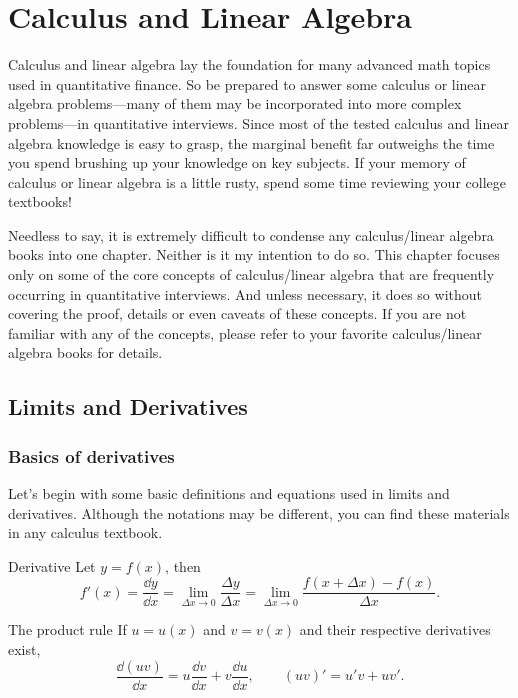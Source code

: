 \section{Calculus and Linear Algebra}

Calculus and linear algebra lay the foundation for many advanced math topics used in
quantitative finance. So be prepared to answer some calculus or linear algebra
problems---many of them may be incorporated into more complex problems---in
quantitative interviews. Since most of the tested calculus and linear algebra knowledge
is easy to grasp, the marginal benefit far outweighs the time you spend brushing up your
knowledge on key subjects. If your memory of calculus or linear algebra is a little rusty,
spend some time reviewing your college textbooks!

Needless to say, it is extremely difficult to condense any calculus/linear algebra books
into one chapter. Neither is it my intention to do so. This chapter focuses only on some
of the core concepts of calculus/linear algebra that are frequently occurring in
quantitative interviews. And unless necessary, it does so without covering the proof,
details or even caveats of these concepts. If you are not familiar with any of the concepts,
please refer to your favorite calculus/linear algebra books for details.

\subsection{Limits and Derivatives}

\subsubsection*{Basics of derivatives}

Let's begin with some basic definitions and equations used in limits and derivatives.
Although the notations may be different, you can find these materials in any calculus
textbook.

\begin{concept}{Derivative}
Let $y=f(x)$, then
\[
f'(x)=\frac{\dd y}{\dd x}=\lim_{\Delta x\to0}\frac{\Delta y}{\Delta x}
=\lim_{\Delta x\to0}\frac{f(x+\Delta x)-f(x)}{\Delta x}.
\]
\end{concept}

\begin{concept}{The product rule}
If $u=u(x)$ and $v=v(x)$ and their respective derivatives exist,
\[
\frac{\dd(uv)}{\dd x}=u\frac{\dd v}{\dd x}+v\frac{\dd u}{\dd x},
\qquad (uv)'=u'v+uv'.
\]
\end{concept}

